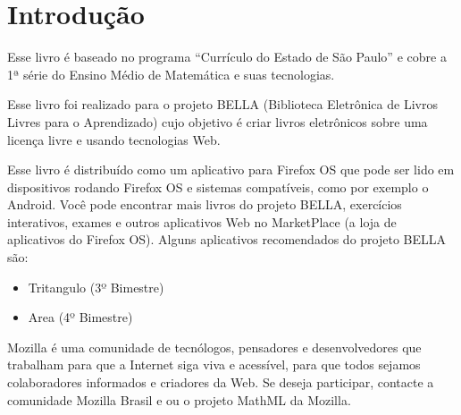 \section*{Introdução}

Esse livro é baseado no programa ``Currículo do Estado de São Paulo''
e cobre a 1ª série do Ensino Médio de Matemática e suas tecnologias.

Esse livro foi realizado para o projeto BELLA
(Biblioteca Eletrônica de Livros Livres para o Aprendizado) cujo objetivo
é criar livros eletrônicos sobre uma licença livre e usando tecnologias Web.

Esse livro é distribuído como um aplicativo para Firefox OS que pode ser lido em
dispositivos rodando Firefox OS e sistemas compatíveis, como por exemplo o
Android. Você pode encontrar mais livros do projeto BELLA, exercícios
interativos, exames e outros aplicativos Web no MarketPlace (a loja de
aplicativos do Firefox OS). Alguns aplicativos recomendados do projeto BELLA
são:

\begin{itemize}
\item Tritangulo (3º Bimestre)
\item Area (4º Bimestre)
\end{itemize}

Mozilla é uma comunidade de tecnólogos, pensadores e desenvolvedores que
trabalham para que a Internet siga viva e acessível, para que todos sejamos
colaboradores informados e criadores da Web. Se deseja participar, contacte a
comunidade Mozilla Brasil e ou o projeto MathML da Mozilla.

